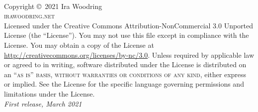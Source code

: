 \documentclass[11pt,fleqn]{book} %
\begin{document}

\begingroup
\thispagestyle{empty} %
\vfill
\endgroup


\newpage
~\vfill
\thispagestyle{empty}

\noindent Copyright \copyright\ 2021 Ira Woodring\\ %


\noindent \textsc{irawoodring.net}\\ %

\noindent Licensed under the Creative Commons Attribution-NonCommercial 3.0 Unported License (the ``License''). You may not use this file except in compliance with the License. You may obtain a copy of the License at \url{http://creativecommons.org/licenses/by-nc/3.0}. Unless required by applicable law or agreed to in writing, software distributed under the License is distributed on an \textsc{``as is'' basis, without warranties or conditions of any kind}, either express or implied. See the License for the specific language governing permissions and limitations under the License.\\ %

\noindent \textit{First release, March 2021} %
\end{document}
